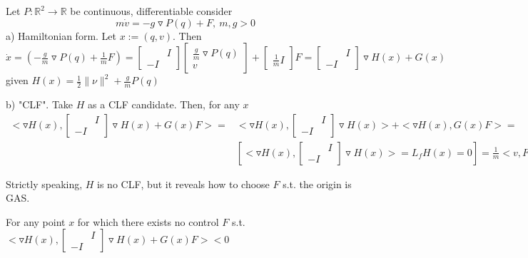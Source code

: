 Let $P: \mathbb{R}^2 \to \mathbb{R}$ be continuous, differentiable consider 
\begin{equation*}
m\dot{v}  = - g \triangledown P(q) + F, \ m,g >0
\end{equation*} 
a) Hamiltonian form. Let $x:=(q,v)$. Then $\dot{x} = (-\frac{g}{m}\triangledown P(q) + \frac{1}{m}F)= \begin{bmatrix}
 & I \\
 -I & 
\end{bmatrix}\begin{bmatrix}
 \frac{g}{m}\triangledown P(q) \\
 v 
\end{bmatrix} + \begin{bmatrix}
  \\
 \frac{1}{m}I
\end{bmatrix}F = \begin{bmatrix}
 & I \\
 -I & 
\end{bmatrix} \triangledown H(x) + G(x)$ given $H(x) = \frac{1}{2}\|\nu\|^2 + \frac{g}{m}P(q)$

b) "CLF". Take $H$ as a CLF candidate. Then, for any $x$ 
\begin{equation*}
\begin{split}
<\triangledown H(x), \begin{bmatrix}
 & I \\
 -I & 
\end{bmatrix} \triangledown H(x) + G(x)F> =& <\triangledown H(x), \begin{bmatrix}
 & I \\
 -I & 
\end{bmatrix} \triangledown H(x)> + <\triangledown H(x), G(x)F> = \\
& [<\triangledown H(x), \begin{bmatrix}
 & I \\
 -I & 
\end{bmatrix} \triangledown H(x)> = L_fH(x) = 0] = \frac{1}{m} <v, F>
\end{split}
\end{equation*}

Strictly speaking, $H$ is no CLF, but it reveals how to choose $F$ s.t. the origin is GAS.

For any point $x$ for which there exists no control $F$ s.t. $<\triangledown H(x), \begin{bmatrix}
 & I \\
 -I & 
\end{bmatrix} \triangledown H(x) + G(x)F> < 0$

